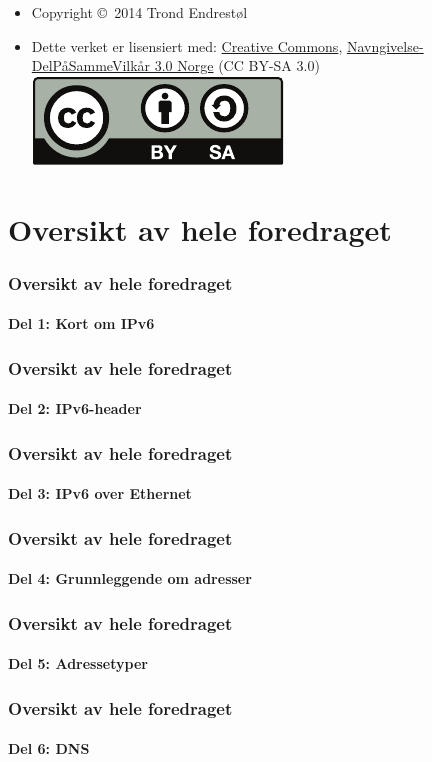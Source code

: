 \begin{frame}[allowframebreaks]
\begin{itemize}
    \svndriverfil
  \item Copyright \copyright\ 2014 Trond Endrestøl
  \item Dette verket er lisensiert med:
    \href{http://creativecommons.org/}{Creative Commons},
    \href{http://creativecommons.org/licenses/by-sa/3.0/no/}{Navngivelse-DelPåSammeVilkår
      3.0 Norge} (CC BY-SA
    3.0)\hfill\includegraphics[scale=.25]{by-sa.pdf}
  \end{itemize}
\end{frame}

\section*{Oversikt av hele foredraget}
\begin{frame}%
  \frametitle{Oversikt av hele foredraget}
  \framesubtitle{Del 1: Kort om IPv6}
  \tableofcontents[part=1]%
\end{frame}

\begin{frame}%
  \frametitle{Oversikt av hele foredraget}
  \framesubtitle{Del 2: IPv6-header}
  \tableofcontents[part=2]%
\end{frame}

\begin{frame}%
  \frametitle{Oversikt av hele foredraget}
  \framesubtitle{Del 3: IPv6 over Ethernet}
  \tableofcontents[part=3]%
\end{frame}

\begin{frame}%
  \frametitle{Oversikt av hele foredraget}
  \framesubtitle{Del 4: Grunnleggende om adresser}
  \tableofcontents[part=4]%
\end{frame}

\begin{frame}%
  \frametitle{Oversikt av hele foredraget}
  \framesubtitle{Del 5: Adressetyper}
  \tableofcontents[part=5]%
\end{frame}

\begin{frame}%
  \frametitle{Oversikt av hele foredraget}
  \framesubtitle{Del 6: DNS}
  \tableofcontents[part=6]%
\end{frame}

